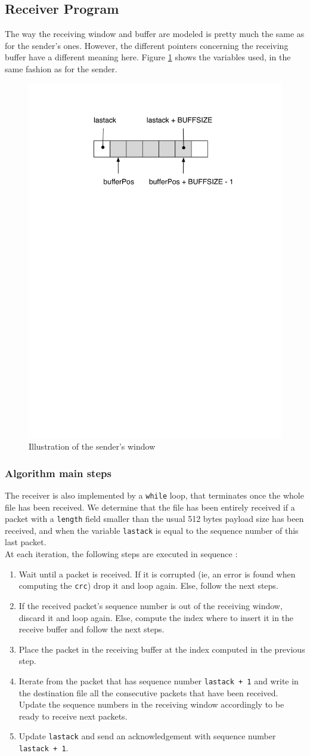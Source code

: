 \documentclass[11pt,a4paper,titlepage]{article}
\begin{document}
\subsection{Receiver Program}
The way the receiving window and buffer are modeled is pretty much the same as for the sender's ones. However, the different pointers concerning the receiving buffer have a different meaning here. Figure \ref{fig:recv_win} shows the variables used, in the same fashion as for the sender.
\begin{figure}[!ht]
	\centering
	\includegraphics[width=.4\textwidth]{figure/receiving_win.pdf}
	\caption{\label{fig:recv_win} Illustration of the sender's window}
\end{figure}

\subsubsection{Algorithm main steps}
The receiver is also implemented by a \texttt{while} loop, that terminates once the whole file has been received. We determine that the file has been entirely received if a packet with a \texttt{length} field smaller than the usual 512 bytes payload size has been received, and when the variable \texttt{lastack} is equal to the sequence number of this last packet.\\
At each iteration, the following steps are executed in sequence :
\begin{enumerate}
\item Wait until a packet is received. If it is corrupted (ie, an error is found when computing the \texttt{crc}) drop it and loop again. Else, follow the next steps.
%
\item If the received packet's sequence number is out of the receiving window, discard it and loop again. Else, compute the index where to insert it in the receive buffer and follow the next steps.
%
\item Place the packet in the receiving buffer at the index computed in the previous step.
%
\item Iterate from the packet that has sequence number \texttt{lastack + 1} and write in the destination file all the consecutive packets that have been received. Update the sequence numbers in the receiving window accordingly to be ready to receive next packets.
%
\item Update \texttt{lastack} and send an acknowledgement with sequence number \texttt{lastack + 1}.
\end{enumerate}
\end{document}
